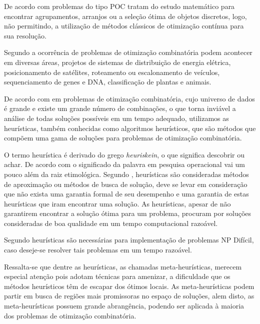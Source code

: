 De acordo com \cite{opac-b1092847} problemas do tipo POC tratam do estudo matemático para encontrar agrupamentos, arranjos ou a seleção ótima de objetos discretos, logo, não permitindo, a utilização de métodos clássicos de otimização contínua para sua resolução.\par


Segundo \cite{golbarg2000otimizaccao} a ocorrência de problemas de otimização combinatória podem acontecer em diversas áreas, projetos de sistemas de distribuição de energia elétrica, posicionamento de satélites, roteamento ou escalonamento de veículos, sequenciamento de genes e DNA, classificação de plantas e animais.\par

De acordo com \cite{deleonardo} em problemas de otimização combinatória, cujo universo de dados é grande e existe um grande número de combinações, o que torna inviável a análise de todas soluções possíveis em um tempo adequado, utilizamos as heurísticas, também conhecidas como algoritmos heurísticos, que são métodos que compõem uma gama de soluções para problemas de otimização combinatória.


O termo heurística é derivado do grego \textit{heuriskein}, o que significa descobrir ou achar. De acordo com \cite{timoteo2005desenvolvimento} o significado da palavra em pesquisa operacional vai um pouco além da raiz etimológica. Segundo \cite{steiglitz1982combinatorial}, heurísticas são consideradas métodos de aproximação ou métodos de busca de solução, deve se levar em consideração que não exista uma garantia formal de seu desempenho e uma garantia de estas heurísticas que iram encontrar uma solução. As heurísticas, apesar de não garantirem encontrar a solução ótima para um problema, procuram por soluções consideradas de boa qualidade em um tempo computacional razoável.\par

Segundo \cite{evans1992optimization} heurísticas são necessárias para implementação de problemas NP Difícil, caso deseje-se resolver tais problemas em um tempo  razoável.\par

Ressalta-se que dentre as heurísticas, as chamadas meta-heurísticas, merecem especial atenção pois adotam técnicas para amenizar, a dificuldade que os métodos heurísticos têm de escapar dos ótimos locais. As meta-heurísticas podem partir em busca de regiões mais promissoras no espaço de soluções, alem disto, as meta-heurísticas possuem grande abrangência, podendo ser aplicada à maioria dos problemas de otimização combinatória.\cite{nascimento2005aplicaccao}\par

